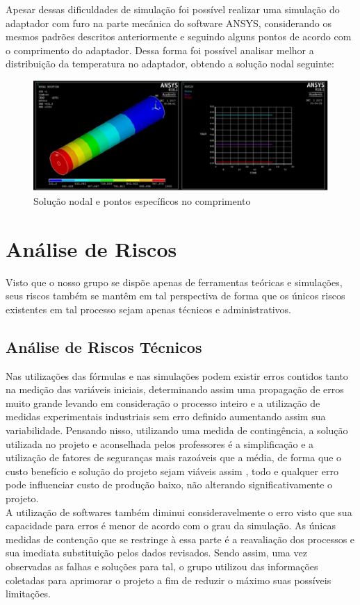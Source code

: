 Apesar dessas dificuldades de simulação foi possível realizar uma simulação do adaptador com furo na parte mecânica do software ANSYS, considerando os mesmos padrões descritos anteriormente e seguindo alguns pontos de acordo com o comprimento do adaptador. Dessa forma foi possível analisar melhor a distribuição da temperatura no adaptador, obtendo a solução nodal seguinte: 
\begin{figure}[!htb]                  
	\centering                          
	\includegraphics[scale=0.8]{figuras/Figura12tc.eps}
	\caption{Solução nodal e pontos específicos no comprimento} \label{fig12tc}              
\end{figure}
\section{Análise de Riscos}
Visto que o nosso grupo se dispõe apenas de ferramentas teóricas e simulações, seus riscos também se mantêm em tal perspectiva de forma que os únicos riscos existentes em tal processo sejam apenas técnicos e administrativos.
\subsection{Análise de Riscos Técnicos}
Nas utilizações das fórmulas e nas simulações podem existir erros contidos tanto na medição das variáveis iniciais, determinando assim uma propagação de erros muito grande levando em consideração o processo inteiro e a utilização de medidas experimentais industriais sem erro definido aumentando assim sua variabilidade. Pensando nisso, utilizando uma medida de contingência, a solução utilizada no projeto e aconselhada pelos professores é a simplificação e a utilização de fatores de seguranças mais razoáveis que a média, de forma que o custo benefício e solução do projeto sejam viáveis assim , todo e qualquer erro pode influenciar custo de produção baixo, não alterando significativamente o projeto. \\
A utilização de softwares também diminui consideravelmente o erro visto que sua capacidade para erros é menor de acordo com o grau da simulação. As únicas medidas de contenção que se restringe à essa parte é a reavaliação dos processos e sua imediata substituição pelos dados revisados. Sendo assim, uma vez observadas as falhas e soluções para tal, o grupo utilizou das informações coletadas para aprimorar o projeto a fim de reduzir o máximo suas possíveis limitações.
